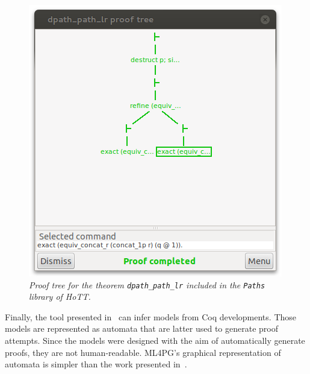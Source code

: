 \begin{figure}
\centering
\includegraphics[scale=.5]{prooftree.png}
\caption{\scriptsize{\emph{Proof tree for the theorem \texttt{dpath\_path\_lr} included in the \texttt{Paths} library of HoTT.}}}\label{fig:prooftree}
\end{figure}

Finally, the tool presented in~\cite{GNR14} can infer models from Coq developments. Those models are represented as automata that are latter used to generate proof attempts. Since the models were designed with the aim of automatically generate proofs, they are not human-readable. 
ML4PG's graphical representation of automata is simpler than the work presented in~\cite{GNR14}.  





